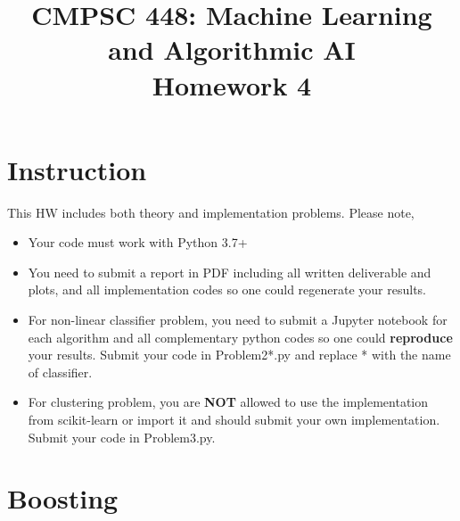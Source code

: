 \documentclass[11pt]{article}
\title{CMPSC 448: Machine Learning and Algorithmic AI \\ Homework 4}
\author{}
\date{}
\theoremstyle{quest}
\begin{document}
\maketitle


\section*{Instruction}
This HW includes both theory and implementation problems. Please note,
\begin{itemize}
    \item Your code must work with Python 3.7+
    \item You need to submit a report in PDF including all written deliverable and plots, and all implementation codes so one could regenerate your results.
    \item For non-linear classifier problem, you need to submit a Jupyter notebook for each algorithm and all complementary python codes so one could \textbf{reproduce} your results. Submit your code in \textsf{Problem2*.py} and replace * with the name of classifier.
    \item For clustering problem, you are \textbf{NOT} allowed to use the implementation from \textsf{scikit-learn} or import it and should submit your own implementation. Submit your code in \textsf{Problem3.py}.
\end{itemize}

\section*{Boosting}
\end{document}
